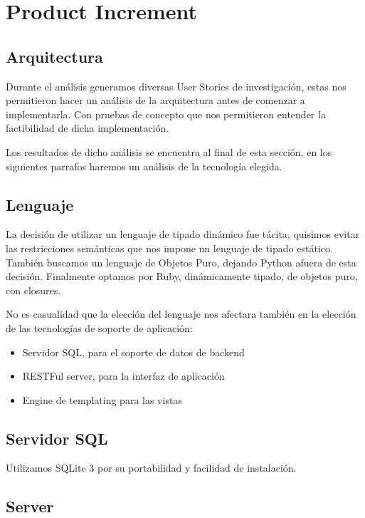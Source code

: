 \section{Product Increment}
\subsection{Arquitectura} %
\label{sub:Arquitectura}

Durante el an\'alisis generamos diversas User Stories de investigaci\'on, estas nos permitieron hacer un an\'alisis de la arquitectura antes de comenzar a implementarla.
Con pruebas de concepto que nos permitieron entender la factibilidad de dicha implementaci\'on.

Los resultados de dicho an\'alisis se encuentra al final de esta secci\'on, en los siguientes parrafos haremos un an\'alisis de la tecnolog\'ia elegida.

\subsection{Lenguaje}
La decisi\'on de utilizar un lenguaje de tipado din\'amico fue t\'acita, quisimos evitar las restricciones sem\'anticas que nos impone un lenguaje de tipado est\'atico.  
Tambi\'en buscamos un lenguaje de Objetos Puro, dejando Python afuera de esta decisi\'on.  
Finalmente optamos por Ruby, din\'amicamente tipado, de objetos puro, con closures.


No es casualidad que la elecci\'on del lenguaje nos afectara tambi\'en en la elecci\'on de las tecnolog\'ias de soporte de aplicaci\'on:
\begin{itemize}
    \item Servidor SQL, para el soporte de datos de backend
    \item RESTFul server, para la interfaz de aplicaci\'on
    \item Engine de templating para las vistas
\end{itemize}

\subsection{Servidor SQL}
Utilizamos SQLite 3 por su portabilidad y facilidad de instalaci\'on.

\subsection{Server}

